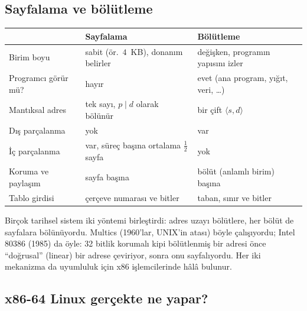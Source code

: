 \documentclass[11pt,a4paper]{article}
\begin{document}
\subsection{Sayfalama ve bölütleme}

\begin{center}
\renewcommand{\arraystretch}{1.3}
\begin{tabularx}{\linewidth}{>{\raggedright\arraybackslash}p{3.6cm} >{\raggedright\arraybackslash}X >{\raggedright\arraybackslash}X}
\toprule
 & \textbf{Sayfalama} & \textbf{Bölütleme} \\
\midrule
Birim boyu & sabit (ör.\ $4$~KB), donanım belirler & değişken, programın yapısını izler \\
Programcı görür mü? & hayır & evet (ana program, yığıt, veri, \dots) \\
Mantıksal adres & tek sayı, $p \mid d$ olarak bölünür & bir çift $\langle s, d\rangle$ \\
Dış parçalanma & yok & var \\
İç parçalanma & var, süreç başına ortalama $\tfrac12$ sayfa & yok \\
Koruma ve paylaşım & sayfa başına & bölüt (anlamlı birim) başına \\
Tablo girdisi & çerçeve numarası ve bitler & taban, sınır ve bitler \\
\bottomrule
\end{tabularx}
\end{center}

\begin{histnote}
Birçok tarihsel sistem iki yöntemi birleştirdi: adres uzayı bölütlere, her bölüt de sayfalara bölünüyordu. Multics (1960'lar, UNIX'in atası) böyle çalışıyordu; Intel 80386 (1985) da öyle: 32 bitlik korumalı kipi bölütlenmiş bir adresi önce ``doğrusal'' (linear) bir adrese çeviriyor, sonra onu sayfalıyordu. Her iki mekanizma da uyumluluk için x86 işlemcilerinde hâlâ bulunur.
\end{histnote}

\subsection{x86-64 Linux gerçekte ne yapar?}
\label{sec:x86}
\end{document}
